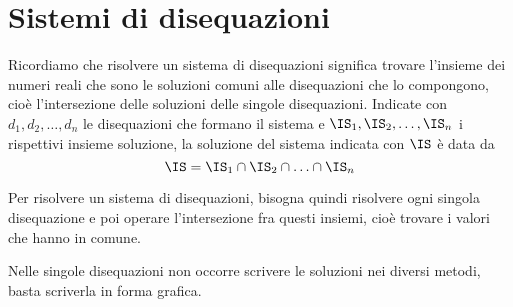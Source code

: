 \section{Sistemi di disequazioni}
\label{sec:diseq_sistemi}

Ricordiamo che risolvere un sistema di disequazioni significa trovare 
l'insieme dei numeri reali che sono le soluzioni comuni alle disequazioni che 
lo compongono, cioè l'intersezione delle soluzioni delle singole 
disequazioni. 
Indicate con \(d_{1}, d_{2}, \ldots, d_n\) le disequazioni che formano 
il sistema e \(\IS_{1}, \IS_{2}, \ldots,\IS_n\) i rispettivi insieme 
soluzione, la soluzione del sistema indicata con \(\IS\) è data da 
\[\IS=\IS_1 \cap \IS_2 \cap \ldots \cap \IS_n\]

Per risolvere un sistema di disequazioni, bisogna quindi risolvere ogni 
singola disequazione e poi operare l'intersezione fra questi insiemi, cioè 
trovare i valori che hanno in comune.

\begin{osservazione}{}{}
 Nelle singole disequazioni non occorre scrivere le soluzioni nei diversi 
metodi, basta scriverla in forma grafica.
\end{osservazione}


